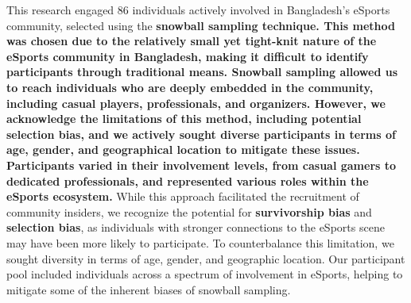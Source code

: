 \documentclass[manuscript,screen,review,anonymous]{acmart}
\begin{document}

This research engaged 86 individuals actively involved in Bangladesh's eSports community, selected using the \textbf{snowball sampling technique. This method was chosen due to the relatively small yet tight-knit nature of the eSports community in Bangladesh, making it difficult to identify participants through traditional means. Snowball sampling allowed us to reach individuals who are deeply embedded in the community, including casual players, professionals, and organizers. However, we acknowledge the limitations of this method, including potential selection bias, and we actively sought diverse participants in terms of age, gender, and geographical location to mitigate these issues. Participants varied in their involvement levels, from casual gamers to dedicated professionals, and represented various roles within the eSports ecosystem.} While this approach facilitated the recruitment of community insiders, we recognize the potential for \textbf{survivorship bias} and \textbf{selection bias}, as individuals with stronger connections to the eSports scene may have been more likely to participate. To counterbalance this limitation, we sought diversity in terms of age, gender, and geographic location. Our participant pool included individuals across a spectrum of involvement in eSports, helping to mitigate some of the inherent biases of snowball sampling.



\end{document}
